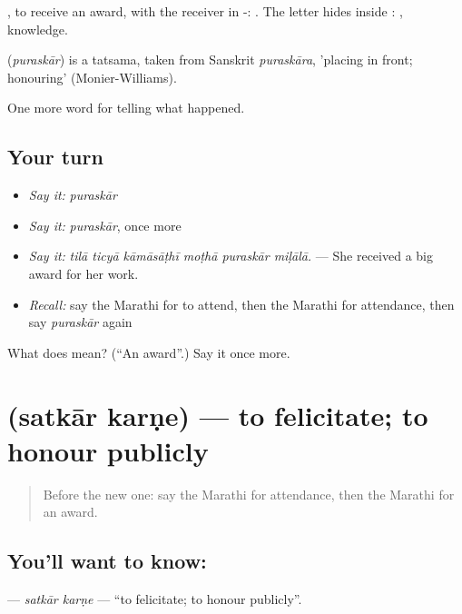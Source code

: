  , to receive an award, with the receiver in -: . The letter  hides inside : , knowledge.

\begin{cousinweb}
\textbf{} (\emph{puraskār}) is a tatsama, taken from Sanskrit \emph{puraskāra}, 'placing in front; honouring' (Monier-Williams).
\end{cousinweb}

\begin{grammarlens}[title={What you've built}]
One more word for telling what happened.
\end{grammarlens}

\subsection*{Your turn}
\begin{itemize}
\raggedright
  \item \emph{Say it:} \emph{puraskār}
  \item \emph{Say it:} \emph{puraskār}, once more
  \item \emph{Say it:} \emph{tilā ticyā kāmāsāṭhī moṭhā puraskār miḷālā.} — She received a big award for her work.
  \item \emph{Recall:} say the Marathi for to attend, then the Marathi for attendance, then say \emph{puraskār} again
\end{itemize}

\begin{tcolorbox}[breakable,colback=teal!4,colframe=teal!35!black,title={Before you move on}]
What does  mean? (\textquotedblleft{}An award\textquotedblright{}.) Say it once more.
\end{tcolorbox}
\section[\texorpdfstring{\mr{सत्कार} \mr{करणे} (satkār karṇe)}{सत्कार करणे (satkār karṇe)}]{  (satkār karṇe) — to felicitate; to honour publicly}

\label{lesson:MR-C322-satkar-karne}



\begin{quote}
Before the new one: say the Marathi for attendance, then the Marathi for an award.
\end{quote}

\subsection*{You'll want to know:  }
\textbf{ } — \emph{satkār karṇe} — \textquotedblleft{}to felicitate; to honour publicly\textquotedblright{}.

